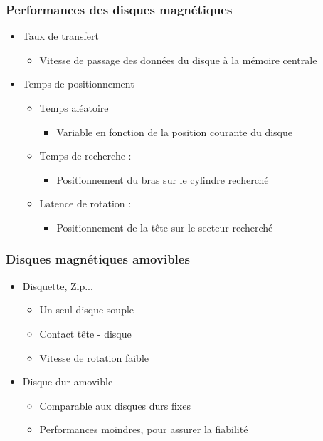 \begin{frame}
\frametitle{Performances des disques magnétiques}
\begin{itemize}
\item Taux de transfert
\begin{itemize}
\item Vitesse de passage des données du disque à la mémoire centrale
\end{itemize}
\item Temps de positionnement
\begin{itemize}
\item Temps aléatoire
\begin{itemize}
\item Variable en fonction de la position courante du disque
\end{itemize}


\item Temps de recherche :
\begin{itemize}
\item Positionnement du bras sur le cylindre recherché
\end{itemize}
\item Latence de rotation :
\begin{itemize}
\item Positionnement de la tête sur le secteur recherché
\end{itemize}
\end{itemize}
\end{itemize}
\end{frame}


\begin{frame}
\frametitle{Disques magnétiques amovibles}
\begin{itemize}
\item Disquette, Zip...
\begin{itemize}
\item Un seul disque souple
\item Contact tête - disque
\item Vitesse de rotation faible
\end{itemize}
\item Disque dur amovible
\begin{itemize}
\item Comparable aux disques durs fixes
\item Performances moindres, pour assurer la fiabilité
\end{itemize}
\end{itemize}
\end{frame}


